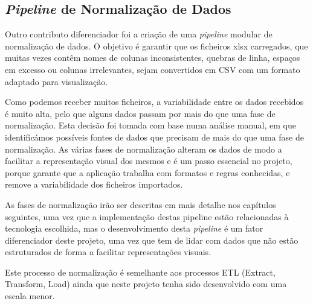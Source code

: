 \subsection{\textit{Pipeline} de Normalização de Dados}

Outro contributo diferenciador foi a criação de uma \textit{pipeline} modular de normalização de dados. O objetivo é garantir que os ficheiros \gls{xlsx} carregados, que muitas vezes contêm nomes de colunas inconsistentes, quebras de linha, espaços em excesso ou colunas irrelevantes, sejam convertidos em CSV com um formato adaptado para visualização. 

Como podemos receber muitos ficheiros, a variabilidade entre os dados recebidos é muito alta, pelo que alguns dados passam por mais do que uma fase de normalização. Esta decisão foi tomada com base numa análise manual, em que identificámos possíveis fontes de dados que precisam de mais do que uma fase de normalização. As várias fases de normalização alteram os dados de modo a facilitar a representação visual dos mesmos e é um passo essencial no projeto, porque garante que a aplicação trabalha com formatos e regras conhecidas, e remove a variabilidade dos ficheiros importados.

As fases de normalização irão ser descritas em mais detalhe nos capítulos seguintes, uma vez que a implementação destas pipeline estão relacionadas à tecnologia escolhida, mas o desenvolvimento desta \textit{pipeline} é um fator diferenciador deste projeto, uma vez que tem de lidar com dados que não estão estruturados de forma a facilitar representações visuais. 

Este processo de normalização é semelhante aos processos ETL (Extract, Transform, Load) ainda que neste projeto tenha sido desenvolvido com uma escala menor.

